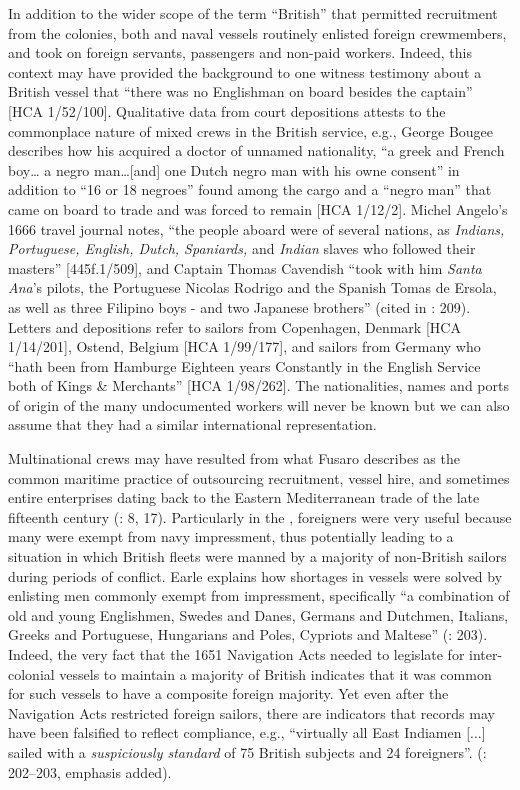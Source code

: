   In addition to the wider scope of the term “British” that permitted recruitment from the colonies, both  and naval vessels routinely enlisted foreign crewmembers, and took on foreign servants, passengers and non-paid workers. Indeed, this context may have provided the background to one witness testimony about a British vessel that “there was no Englishman on board besides the captain” [HCA 1/52/100]. Qualitative data from court depositions attests to the commonplace nature of mixed crews in the British service, e.g., George Bougee describes how his  acquired a doctor of unnamed nationality, “a greek and French boy… a negro man…[and] one Dutch negro man with his owne consent” in addition to “16 or 18 negroes” found among the cargo and a “negro man” that came on board to trade and was forced to remain [HCA 1/12/2]. Michel Angelo’s 1666 travel journal notes, “the people aboard were of several nations, as \textit{Indians, Portuguese, English, Dutch, Spaniards,} and \textit{Indian} slaves who followed their masters” [445f.1/509], and Captain Thomas Cavendish “took with him \textit{Santa Ana}’s pilots, the Portuguese Nicolas Rodrigo and the Spanish Tomas de Ersola, as well as three Filipino boys - and two Japanese brothers” (cited in \citealt{Bicheno2012}: 209). Letters and depositions refer to sailors from Copenhagen, Denmark [HCA 1/14/201], Ostend, Belgium [HCA 1/99/177], and sailors from Germany who “hath been from Hamburge Eighteen years Constantly in the English Service both of Kings \& Merchants” [HCA 1/98/262]. The nationalities, names and ports of origin of the many undocumented workers will never be known but we can also assume that they had a similar international representation.

Multinational crews may have resulted from what Fusaro describes as the common maritime practice of outsourcing  recruitment, vessel hire, and sometimes entire enterprises dating back to the Eastern Mediterranean trade of the late fifteenth century (\citeyear*{Fusaro2015}: 8, 17). Particularly in the , foreigners were very useful because many were exempt from navy impressment, thus potentially leading to a situation in which British  fleets were manned by a majority of non-British sailors during periods of conflict. Earle explains how  shortages in  vessels were solved by enlisting men commonly exempt from impressment, specifically “a combination of old and young Englishmen, Swedes and Danes, Germans and Dutchmen, Italians, Greeks and Portuguese, Hungarians and Poles, Cypriots and Maltese” (\citealt{Earle1998}: 203). Indeed, the very fact that the 1651 Navigation Acts needed to legislate for inter-colonial  vessels to maintain a majority of British  indicates that it was common for such vessels to have a composite foreign majority. Yet even after the Navigation Acts restricted foreign sailors, there are indicators that records may have been falsified to reflect compliance, e.g., “virtually all East Indiamen [...] sailed with a \textit{suspiciously standard}  of 75 British subjects and 24 foreigners”. (\citealt{Earle1998}: 202–203, emphasis added). 

